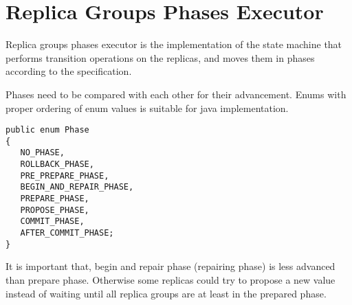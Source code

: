 \section{Replica Groups Phases Executor}
Replica groups phases executor is the implementation of the state machine that performs transition operations on the replicas, and moves them in phases according to the specification.

Phases need to be compared with each other for their advancement. Enums with proper ordering of enum values is suitable for java implementation.

\begin{lstlisting}[style=outcode,label={lst:phaseEnum},caption={Phase enum}]
public enum Phase
{
   NO_PHASE,
   ROLLBACK_PHASE,
   PRE_PREPARE_PHASE,
   BEGIN_AND_REPAIR_PHASE,
   PREPARE_PHASE,
   PROPOSE_PHASE,
   COMMIT_PHASE,
   AFTER_COMMIT_PHASE;
}
\end{lstlisting}

It is important that, begin and repair phase (repairing phase) is less advanced than prepare phase. Otherwise some replicas could try to propose a new value instead of waiting until all replica groups are at least in the prepared phase.

